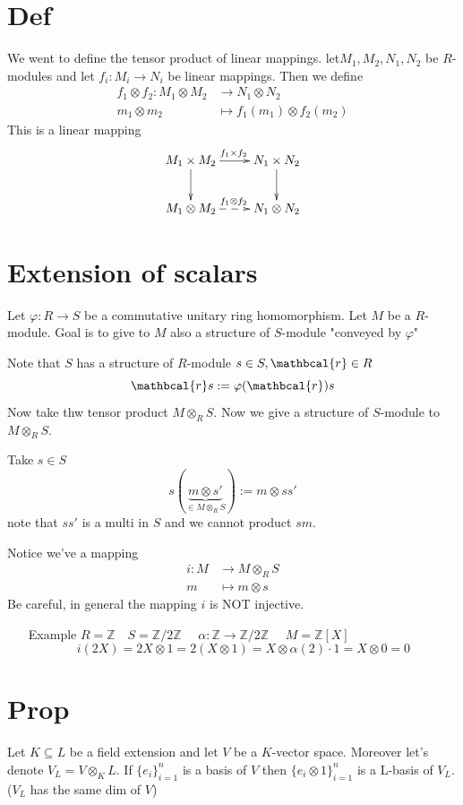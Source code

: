 \documentclass{book}
\begin{document}
\section{Def}
We went to define the tensor product of linear mappings. let$M_1,M_2,N_1,N_2$ be $R$-modules and let $f_i:M_i\rightarrow N_i$ be linear mappings. Then we define $$
\begin{aligned}
    f_1\otimes f_2:M_1\otimes M_2 &\rightarrow N_1\otimes N_2\\
    m_1\otimes m_2 &\mapsto f_1(m_1)\otimes f_2(m_2)
\end{aligned}
$$
This is a linear mapping
$$\xymatrix{
    M_1\times M_2\ar[d]\ar[r]^{f_1\times f_2}& N_1\times N_2\ar[d]\\
    M_1\otimes M_2 \ar@{-->}^{f_1\otimes f_2}[r] &N_1\otimes N_2
}$$
\section{Extension of scalars}
Let $\varphi:R\rightarrow S$ be a commutative unitary ring homomorphism. Let $M$ be a $R$-module. Goal is to give to $M$ also a structure of $S$-module "conveyed by $\varphi$"

Note that $S$ has a structure of $R$-module $s\in S,\mathbcal{r}\in R$$$\mathbcal{r}s:=\varphi(\mathbcal{r})s$$
Now take thw tensor product $M\otimes_RS$. Now we give a structure of $S$-module to $M\otimes_RS$. 

Take $s\in S$$$s(\underbrace{m\otimes s'}\limits_{\in M\otimes_RS}):=m\otimes ss'$$
note that $ss'$ is a multi in $S$ and we cannot product $sm$.

Notice we've a mapping
$$\begin{aligned}
    i: M&\rightarrow M\otimes_RS\\
    m &\mapsto m\otimes s
\end{aligned}$$
Be careful, in general the mapping $i$ is NOT injective.
\begin{itemize}
    \item [Example]
    $R=\mathbb{Z}\quad S=\mathbb{Z}/2\mathbb{Z}\quad$
    $\alpha:\mathbb{Z}\rightarrow \mathbb{Z}/2\mathbb{Z}$
    $\quad M=\mathbb{Z}[X]$
    $$i(2X)=2X\otimes 1=2(X\otimes 1)=X\otimes \alpha(2)\cdot 1=X\otimes 0=0$$
\end{itemize}
\section{Prop}
Let $K\subseteq L$ be a field extension and let $V$ be a $K$-vector space. Moreover let's denote $V_L=V\otimes_KL$. If $\{e_i\}_{i=1}^n$ is a basis of $V$ then $\{e_i\otimes 1\}_{i=1}^n$ is a L-basis of $V_L$.($V_L$ has the same dim of $V$)
\end{document}
